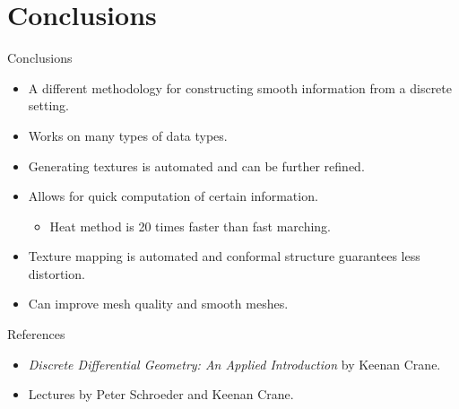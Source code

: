 \documentclass[UKenglish]{beamer}
\begin{document}
\section{Conclusions}

\begin{frame}{Conclusions}
    \begin{itemize}
        \item A different methodology for constructing smooth information from a discrete setting.
        \item Works on many types of data types.
        \item Generating textures is automated and can be further refined.
        \item Allows for quick computation of certain information.
        \begin{itemize}
            \item Heat method is 20 times faster than fast marching.
        \end{itemize}
        \item Texture mapping is automated and conformal structure guarantees less distortion.
        \item Can improve mesh quality and smooth meshes.
    \end{itemize}
\end{frame}


\begin{frame}{References}
    \begin{itemize}
        \item \emph{Discrete Differential Geometry: An Applied Introduction} by Keenan Crane.
        \item Lectures by Peter Schroeder and Keenan Crane.
    \end{itemize}
    
\end{frame}
\end{document}
